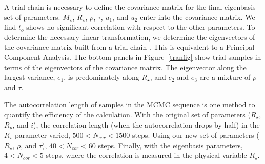 \documentclass{emulateapj}
\begin{document}
A trial chain is necessary to define the covariance matrix for the
final eigenbasis set of parameters.  $M_{\star}$, $R_{\star}$, $\rho$,
$\tau$, $u_{1}$, and $u_{2}$ enter into the covariance matrix.  We
find $t_{o}$ shows no significant correlation with respect to the
other parameters.  To determine the necessary linear transformation,
we determine the eigenvectors of the covariance matrix built from a
trial chain \citep{TEG04}.  This is equivalent to a Principal
Component Analysis.  The bottom panels in Figure~\ref{tranfig} show
trial samples in terms of the eigenvectors of the covariance matrix.
The eigenvector along the largest variance, $e_{1}$, is predominately
along $R_{\star}$, and $e_{2}$ and $e_{3}$ are a mixture of $\rho$ and
$\tau$.

The autocorrelation length of samples in the MCMC sequence is one
method to quantify the efficiency of the calculation.  With the
original set of parameters ($R_{\star}$, $R_{p}$, and $i$), the
correlation length (when the autocorrelation drops by half) in the
$R_{\star}$ parameter varied, $500<N_{cor}<1500$ steps.  Using our new
set of parameters ($R_{\star}$, $\rho$, and $\tau$), $40<N_{cor}<60$
steps.  Finally, with the eigenbasis parameters, $4<N_{cor}<5$ steps,
where the correlation is measured in the physical variable
$R_{\star}$.
\end{document}
